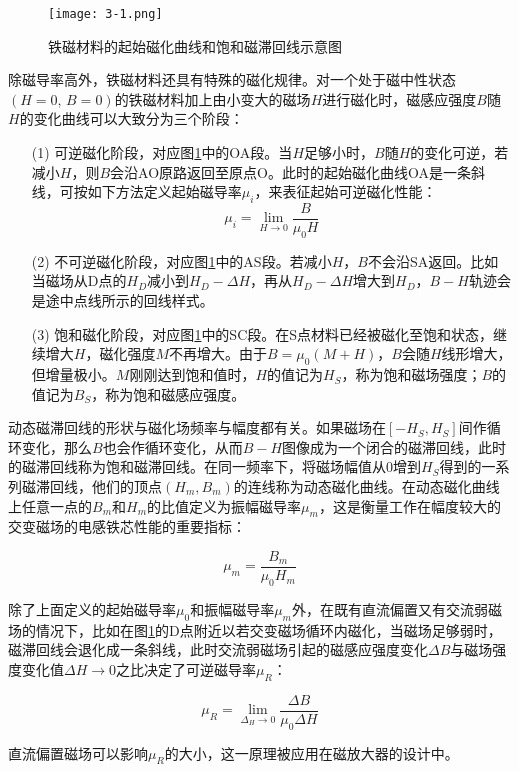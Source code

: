 \documentclass[12pt]{article}
\begin{document}
\begin{figure}[htbp]
    \centering
    \texttt{[image: 3-1.png]}
    \caption{铁磁材料的起始磁化曲线和饱和磁滞回线示意图}
    \label{fig:1}
\end{figure}

除磁导率高外，铁磁材料还具有特殊的磁化规律。对一个处于磁中性状态$ (H=0,\,B=0) $的铁磁材料加上由小变大的磁场$ H $进行磁化时，磁感应强度$ B $随$ H $的变化曲线可以大致分为三个阶段：

\begin{enumerate}
    \item[(1)] 可逆磁化阶段，对应图\ref{fig:1}中的OA段。当$H$足够小时，$B$随$H$的变化可逆，若减小$H$，则$B$会沿AO原路返回至原点O。此时的起始磁化曲线OA是一条斜线，可按如下方法定义起始磁导率$\mu_i$，来表征起始可逆磁化性能：
    \[
        \mu_i=\lim_{H\to0}\frac{B}{\mu_0H}
    \]
    \item[(2)] 不可逆磁化阶段，对应图\ref{fig:1}中的AS段。若减小$H$，$B$不会沿SA返回。比如当磁场从D点的$H_D$减小到$H_D-\Delta H$，再从$H_D-\Delta H$增大到$H_D$，$B-H$轨迹会是途中点线所示的回线样式。
    \item[(3)] 饱和磁化阶段，对应图\ref{fig:1}中的SC段。在S点材料已经被磁化至饱和状态，继续增大$H$，磁化强度$M$不再增大。由于$B=\mu_0(M+H)$，$B$会随$H$线形增大，但增量极小。$M$刚刚达到饱和值时，$H$的值记为$H_S$，称为饱和磁场强度；$B$的值记为$B_S$，称为饱和磁感应强度。
\end{enumerate}
	
动态磁滞回线的形状与磁化场频率与幅度都有关。如果磁场在$ [-H_S,H_S] $间作循环变化，那么$ B $也会作循环变化，从而$ B-H $图像成为一个闭合的磁滞回线，此时的磁滞回线称为饱和磁滞回线。在同一频率下，将磁场幅值从0增到$ H_S $得到的一系列磁滞回线，他们的顶点$ (H_m,B_m) $的连线称为动态磁化曲线。在动态磁化曲线上任意一点的$B_m$和$H_m$的比值定义为振幅磁导率$\mu_m$，这是衡量工作在幅度较大的交变磁场的电感铁芯性能的重要指标：

\[
    \mu_m=\frac{B_m}{\mu_0H_m}
\]

除了上面定义的起始磁导率$\mu_0$和振幅磁导率$\mu_m$外，在既有直流偏置又有交流弱磁场的情况下，比如在图\ref{fig:1}的D点附近以若交变磁场循环内磁化，当磁场足够弱时，磁滞回线会退化成一条斜线，此时交流弱磁场引起的磁感应强度变化$\Delta B$与磁场强度变化值$\Delta H\to 0$之比决定了可逆磁导率$\mu_R$：

\[
    \mu_R=\lim_{\Delta_H\to0}\frac{\Delta B}{\mu_0\Delta H}
\]

直流偏置磁场可以影响$\mu_R$的大小，这一原理被应用在磁放大器的设计中。
\end{document}
